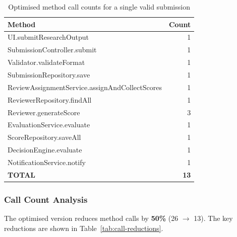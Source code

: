 \documentclass[12pt, a4paper]{article}
\begin{document}
\begin{table}[H]
\centering
\caption{Optimised method call counts for a single valid submission}
\label{tab:optimised-calls}
\begin{tabular}{l r}
    \toprule
    \textbf{Method} & \textbf{Count} \\
    \midrule
    UI.submitResearchOutput & 1 \\
    SubmissionController.submit & 1 \\
    Validator.validateFormat & 1 \\
    SubmissionRepository.save & 1 \\
    ReviewAssignmentService.assignAndCollectScores & 1 \\
    ReviewerRepository.findAll & 1 \\
    Reviewer.generateScore & 3 \\
    EvaluationService.evaluate & 1 \\
    ScoreRepository.saveAll & 1 \\
    DecisionEngine.evaluate & 1 \\
    NotificationService.notify & 1 \\
    \midrule
    \textbf{TOTAL} & \textbf{13} \\
    \bottomrule
\end{tabular}
\end{table}

\subsubsection{Call Count Analysis}

The optimised version reduces method calls by \textbf{50\%} (26 $\rightarrow$ 13). The key reductions are shown in Table~\ref{tab:call-reductions}.
\end{document}

